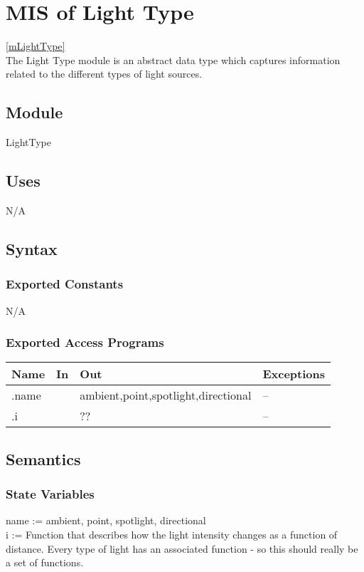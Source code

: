 \documentclass[12pt, titlepage]{article}
\begin{document}
\newpage

\section{MIS of Light Type} \ref{mLightType} \\
The Light Type module is an abstract data type which captures information 
related to the different types of light sources.

\subsection{Module}
LightType

\subsection{Uses}
N/A

\subsection{Syntax}
\subsubsection{Exported Constants}
N/A
\subsubsection{Exported Access Programs}
\begin{center}
	\begin{tabular}{p{4cm} p{2cm} p{2cm} p{4cm}}
		\hline
		\textbf{Name} & \textbf{In} & \textbf{Out} & \textbf{Exceptions} \\
		\hline
		.name & & {ambient,point,spotlight,directional} & -- \\
		.i & & ?? & -- \\
		\hline
	\end{tabular}
\end{center}

\subsection{Semantics}
\subsubsection{State Variables}
name := {ambient, point, spotlight, directional} \\
i := Function that describes how the light intensity changes as a function of 
distance. Every type of light has an associated function - so this should 
really be a set of functions.\\
\end{document}
